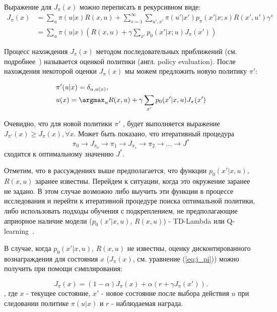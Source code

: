Выражение для $J_\pi(x)$ можно переписать в рекурсивном виде:
\begin{equation}
    \label{eq:j_pi_rec}
    \begin{split}
     J_\pi(x) &=
     \sum_u {\pi(u|x)R(x,u)} +
     \sum_{s=1}^{\infty}
       \sum_{u', x'}{
          \pi(u'|x')p_\pi(x'|x; s)R(x', u')\gamma^s
        } \\
        &= \sum_u {\pi(u|x)} \left(
        R(x,u) + \gamma \sum_{x'}{
        		p_0(x'|x; u)J_{\pi}(x')
            }
       		\right)
            \end{split}
\end{equation}

Процесс нахождения $J_\pi(x)$ методом последовательных приближений (см. подробнее~\cite{sutton1998reinforcement}) называется оценкой политики (англ. policy evaluation). После нахождения некоторой оценки  $J_\pi(x)$ мы можем предложить новую политику $\pi'$:

\begin{equation}
    \label{eq:new_policy}
    \begin{split}
    & \pi'(u|x) = \delta_{u,u(x)}, \\
    & u(x) = \argmax_u R(x, u) + \gamma \sum_{x'} p_0(x'|x, u)J_\pi(x')
    \end{split}
\end{equation}

Очевидно, что для новой политики $\pi'$ , будет выполняется выражение $J_{\pi'}(x) \geq J_\pi(x), \forall x$. Может быть показано, что итеративный процедура $$\pi_0 \rightarrow J_{\pi_0} \rightarrow \pi_1 \rightarrow J_{\pi_1} \rightarrow \pi_2 \rightarrow ... \rightarrow J^*$$ сходится  к оптимальному значению $J^*$.

Отметим, что в рассуждениях выше предполагается, что функции $p_0(x'|x,u)$, $R(x,u)$ заранее известны. Перейдем к ситуации, когда это окружение заранее не задано. В этом случае возможно либо выучить эти функции в процессе исследования и перейти к итеративной процедуре поиска оптимальной политики, либо использовать подходы обучения с подкреплением, не предполагающие априорное наличие модели ($p_0(x'|x,u)$, $R(x,u)$) - TD-Lambda \cite{sutton1998reinforcement} или Q-learning~\cite{Watkins:1989}.

В случае, когда $p_0(x'|x,u)$, $R(x,u)$ не известны, оценку дисконтированного вознаграждения для состояния $x$ ($J_\pi(x)$, см. уравнение (\ref{eq:j_pi})) можно получить при помощи сэмплирования:

\begin{equation}
    \label{eq:j_sampling}
   	J_\pi(x) = (1-\alpha)J_\pi(x) + \alpha(r + \gamma J_\pi(x')).
\end{equation}
, где $x$ - текущее состояние, $x'$ - новое состояние после выбора действия $u$ при следовании политике $\pi(u|x)$ и $r$ - наблюдаемая награда.


